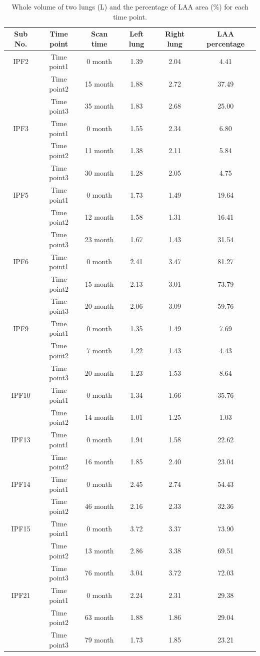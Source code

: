 \begin{table}[htbp]
\centering
\caption{Whole volume of two lungs (L) and the percentage of LAA area (\%) for each time point.}
\label{tab:WholeVolume}
\begin{tabular}{c c c c c c}
\hline
\bf{Sub No.} & \bf{Time point} & \bf{Scan time}	& \bf{Left lung} & \bf{Right lung} & \bf{LAA percentage}\\ 
\hline
IPF2 & Time point1 &	0 month &	1.39 &	2.04 & 4.41\\
\quad & Time point2 &	15 month &	1.88 &	2.72 & 37.49\\
\quad & Time point3 &	35 month &	1.83 &	2.68 & 25.00\\
\hline
IPF3 & Time point1 &	0 month &	1.55 &	2.34 & 6.80\\
\quad & Time point2 &	11 month &	1.38 &	2.11 & 5.84\\
\quad & Time point3 &	30 month &	1.28 &	2.05 & 4.75\\
\hline
IPF5 & Time point1 &  0 month & 1.73 & 1.49 & 19.64\\
\quad & Time point2 & 12 month & 1.58 & 1.31 & 16.41\\
\quad & Time point3 & 23 month & 1.67 & 1.43 & 31.54\\
\hline
IPF6 & Time point1 &	0 month &	2.41 &	3.47 & 81.27\\
\quad & Time point2 &	15 month &	2.13 &	3.01 & 73.79\\
\quad & Time point3 &	20 month &	2.06 &	3.09 & 59.76\\
\hline
IPF9 & Time point1 &	0 month &	1.35 &	1.49 & 7.69\\
\quad & Time point2 &	7 month &	1.22 &	1.43 & 4.43\\
\quad & Time point3 &	20 month &	1.23 &	1.53 & 8.64\\
\hline
IPF10 & Time point1 &	0 month &	1.34 &	1.66 & 35.76\\
\quad & Time point2 &	14 month &	1.01 &	1.25 & 1.03\\
\hline
IPF13 & Time point1 &	0 month &	1.94 &	1.58 & 22.62\\
\quad & Time point2 &	16 month &	1.85 &	2.40 & 23.04\\
\hline
IPF14 & Time point1 &	0 month &	2.45 &	2.74 & 54.43\\
\quad & Time point2 &	46 month &	2.16 &	2.33 & 32.36\\
\hline
IPF15 & Time point1 &	0 month &	3.72 &	3.37 & 73.90\\
\quad & Time point2 &	13 month &	2.86 &	3.38 & 69.51\\
\quad & Time point3 &	76 month &	3.04 &	3.72 & 72.03\\
\hline
IPF21 & Time point1 &	0 month &	2.24 &	2.31 & 29.38\\
\quad & Time point2 &	63 month &	1.88 &	1.86 & 29.04\\
\quad & Time point3 &	79 month &	1.73 &	1.85 & 23.21\\
\hline
\end{tabular}
\end{table}

